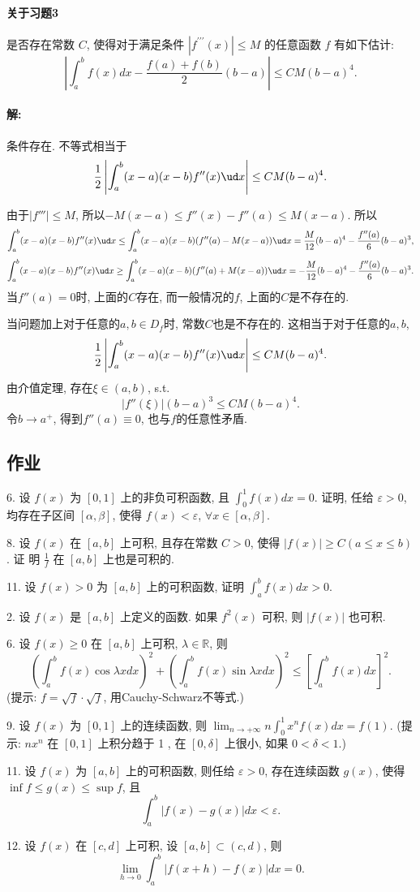 \paragraph{关于习题3}

是否存在常数 $C$, 使得对于满足条件 $\left|f^{\prime\prime\prime}(x)\right|\leqslant M$
的任意函数 $f$ 有如下估计: 
\[
\left|\int_{a}^{b}f(x)dx-\frac{f(a)+f(b)}{2}(b-a)\right|\leqslant CM(b-a)^{4}.
\]


\paragraph{解:}

条件存在. 不等式相当于
\[
\frac{1}{2}\left|\int_{a}^{b}(x-a)(x-b)f''(x)\ud x\right|\le CM(b-a)^{4}.
\]

由于$\left|f'''\right|\le M$, 所以$-M(x-a)\le f''(x)-f''(a)\le M(x-a)$.
所以
\[
\int_{a}^{b}(x-a)(x-b)f''(x)\ud x\le\int_{a}^{b}(x-a)(x-b)(f''(a)-M(x-a))\ud x=\frac{M}{12}(b-a)^{4}-\frac{f''(a)}{6}(b-a)^{3},
\]
\[
\int_{a}^{b}(x-a)(x-b)f''(x)\ud x\ge\int_{a}^{b}(x-a)(x-b)(f''(a)+M(x-a))\ud x=-\frac{M}{12}(b-a)^{4}-\frac{f''(a)}{6}(b-a)^{3}.
\]
当$f''(a)=0$时, 上面的$C$存在, 而一般情况的$f$, 上面的$C$是不存在的.

当问题加上对于任意的$a,b\in D_{f}$时, 常数$C$也是不存在的. 这相当于对于任意的$a,b$, 
\[
\frac{1}{2}\left|\int_{a}^{b}(x-a)(x-b)f''(x)\ud x\right|\le CM(b-a)^{4}.
\]
由介值定理, 存在$\xi\in(a,b)$, s.t. 
\[
\left|f''(\xi)\right|(b-a)^{3}\le CM(b-a)^{4}.
\]
令$b\to a^{+}$, 得到$f''(a)\equiv0$, 也与$f$的任意性矛盾.

\subsection{作业}

6. 设 $f(x)$ 为 $[0,1]$ 上的非负可积函数, 且 $\int_{0}^{1}f(x)dx=0$. 证明, 任给
$\varepsilon>0$, 均存在子区间 $[\alpha,\beta]$, 使得 $f(x)<\varepsilon$,
$\forall x\in[\alpha,\beta]$.

8. 设 $f(x)$ 在 $[a,b]$ 上可积, 且存在常数 $C>0$, 使得 $|f(x)|\geqslant C(a\leqslant x\leqslant b)$.
证 明 $\frac{1}{f}$ 在 $[a,b]$ 上也是可积的.

11. 设 $f(x)>0$ 为 $[a,b]$ 上的可积函数, 证明 $\int_{a}^{b}f(x)dx>0$.

2. 设 $f(x)$ 是 $[a,b]$ 上定义的函数. 如果 $f^{2}(x)$ 可积, 则 $|f(x)|$ 也可积.

6. 设 $f(x)\geqslant0$ 在 $[a,b]$ 上可积, $\lambda\in\mathbb{R}$, 则
\[
\left(\int_{a}^{b}f(x)\cos\lambda xdx\right)^{2}+\left(\int_{a}^{b}f(x)\sin\lambda xdx\right)^{2}\leqslant\left[\int_{a}^{b}f(x)dx\right]^{2}.
\]
(提示: $f=\sqrt{f}\cdot\sqrt{f}$, 用Cauchy-Schwarz不等式.)

9. 设 $f(x)$ 为 $[0,1]$ 上的连续函数, 则 $\lim_{n\rightarrow+\infty}n\int_{0}^{1}x^{n}f(x)dx=f(1)$.
(提示: $nx^{n}$ 在 $[0,1]$ 上积分趋于 1 , 在 $[0,\delta]$ 上很小, 如果 $0<\delta<1$.)

11. 设 $f(x)$ 为 $[a,b]$ 上的可积函数, 则任给 $\varepsilon>0$, 存在连续函数 $g(x)$,
使得 $\inf f\leqslant g(x)\leqslant\sup f$, 且 
\[
\int_{a}^{b}|f(x)-g(x)|dx<\varepsilon.
\]

12. 设 $f(x)$ 在 $[c,d]$ 上可积, 设 $[a,b]\subset(c,d)$, 则 
\[
\lim_{h\rightarrow0}\int_{a}^{b}|f(x+h)-f(x)|dx=0.
\]